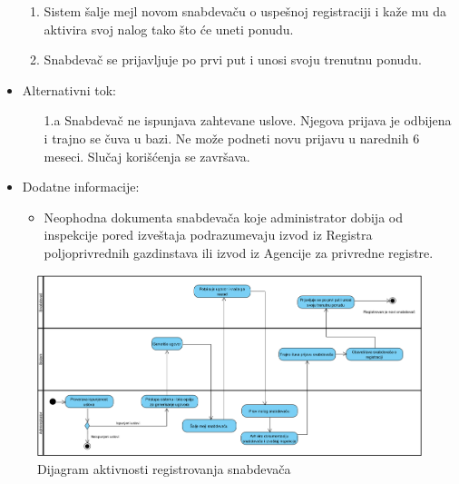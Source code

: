 \begin{itemize}
\begin{enumerate}
		    \item Sistem šalje mejl novom snabdevaču o uspešnoj registraciji i kaže mu da aktivira svoj nalog tako što će uneti ponudu.
		   \item Snabdevač se prijavljuje po prvi put i unosi svoju trenutnu ponudu.
		\end{enumerate}
	\item Alternativni tok:
		\begin{itemize}
			 \item[1.a] Snabdevač ne ispunjava zahtevane uslove. Njegova prijava je odbijena i trajno se čuva u bazi. Ne može podneti novu prijavu u narednih 6 meseci. Slučaj korišćenja se završava.
	
		\end{itemize}
	\item Dodatne informacije:
		\begin{itemize}
			\item Neophodna dokumenta snabdevača koje administrator dobija od inspekcije pored izveštaja podrazumevaju izvod iz Registra poljoprivrednih gazdinstava ili izvod iz Agencije za privredne registre.
		\end{itemize}						
\end{itemize}

\begin{figure}[H]
\begin{center}
\includegraphics[width=\textwidth]{Pictures/activity_supplier_registration.png}
\end{center}
    \caption{Dijagram aktivnosti registrovanja snabdevača}
\label{fig:ActivitySupplierRegistration}
\end{figure}